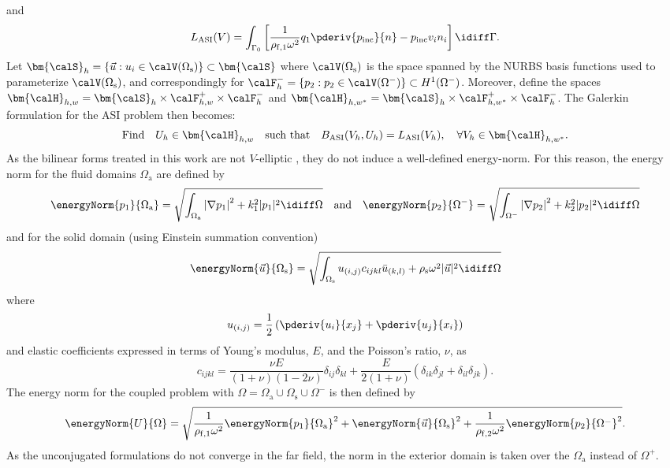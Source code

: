 and
\begin{equation*}
	L_{\mathrm{ASI}}(V) = \int_{\Gamma_0} \left[\frac{1}{\rho_{\mathrm{f},1} \omega^2}q_1\pderiv{p_{\mathrm{inc}}}{n} - p_{\mathrm{inc}} v_i n_i\right]\idiff\Gamma.
\end{equation*}
Let $\bm{\calS}_h=\{\vec{u}: u_i\in \calV(\Omega_{\mathrm{s}})\}\subset\bm{\calS}$ where $\calV(\Omega_{\mathrm{s}})$ is the space spanned by the NURBS basis functions used to parameterize $\calV(\Omega_{\mathrm{s}})$, and correspondingly for $\calF^-_h=\{p_2: p_2\in \calV(\Omega^-)\}\subset H^1(\Omega^-)$. Moreover, define the spaces $\bm{\calH}_{h,w} = \bm{\calS}_h \times \calF^+_{h,w} \times \calF^-_h$ and $\bm{\calH}_{h,w^*} = \bm{\calS}_h\times \calF^+_{h,w^*} \times \calF^-_h$. The Galerkin formulation for the ASI problem then becomes: 
\begin{equation}
	\text{Find}\quad U_h\in\bm{\calH}_{h,w}\quad \text{such that} \quad B_{\mathrm{ASI}}(V_h,U_h) = L_{\mathrm{ASI}}(V_h),\quad \forall V_h\in\bm{\calH}_{h,w^*}.
\end{equation}
As the bilinear forms treated in this work are not $V$-elliptic \cite[p. 46]{Ihlenburg1998fea}, they do not induce a well-defined energy-norm. For this reason, the energy norm for the fluid domains $\Omega_{\mathrm{a}}$ are defined by
\begin{equation}\label{Eq2:energyNormFluids}
	\energyNorm{p_1}{\Omega_{\mathrm{a}}} = \sqrt{\int_{\Omega_{\mathrm{a}}} \left|\nabla p_1\right|^2 + k_1^2|p_1|^2 \idiff\Omega}\quad\text{and}\quad\energyNorm{p_2}{\Omega^-} = \sqrt{\int_{\Omega^-} \left|\nabla p_2\right|^2 + k_2^2|p_2|^2 \idiff\Omega}
\end{equation}
and for the solid domain (using Einstein summation convention)
\begin{equation}
	\energyNorm{\vec{u}}{\Omega_{\mathrm{s}}} = \sqrt{\int_{\Omega_{\mathrm{s}}} u_{(i,j)}c_{ijkl}\bar{u}_{(k,l)} + \rho_{\mathrm{s}}\omega^2|\vec{u}|^2\idiff\Omega}
\end{equation}
where
\begin{equation*}
	u_{(i,j)} = \frac{1}{2}\left(\pderiv{u_i}{x_j} + \pderiv{u_j}{x_i}\right)
\end{equation*}
and elastic coefficients expressed in terms of Young's modulus, $E$, and the Poisson's ratio, $\nu$, as~\cite[p. 110]{Cottrell2009iat}
\begin{equation*}
	c_{ijkl} = \frac{\nu E}{(1+\nu)(1-2\nu)}\delta_{ij}\delta_{kl} +\frac{E}{2(1+\nu)}(\delta_{ik}\delta_{jl} + \delta_{il}\delta_{jk}).
\end{equation*}
The energy norm for the coupled problem with $\Omega = \Omega_{\mathrm{a}}\cup \Omega_{\mathrm{s}}\cup\Omega^-$ is then defined by
\begin{align}\label{Eq2:energyNorm}
	\energyNorm{U}{\Omega} = \sqrt{\frac{1}{\rho_{\mathrm{f},1}\omega^2}\energyNorm{p_1}{\Omega_{\mathrm{a}}}^2 + \energyNorm{\vec{u}}{\Omega_{\mathrm{s}}}^2 + \frac{1}{\rho_{\mathrm{f},2}\omega^2}\energyNorm{p_2}{\Omega^-}^2}.
\end{align}
As the unconjugated formulations do not converge in the far field, the norm in the exterior domain is taken over the $\Omega_{\mathrm{a}}$ instead of $\Omega^+$. 